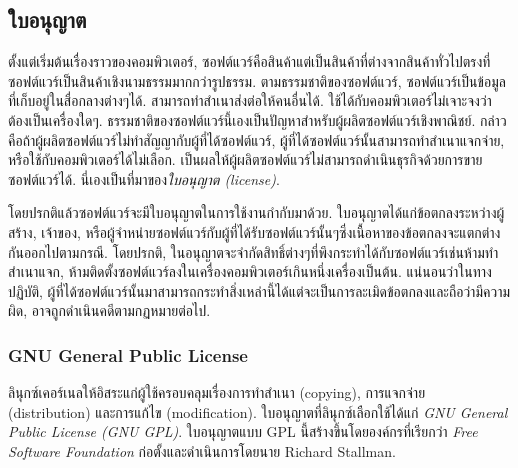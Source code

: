 \begin{thwbr}
{\subsection{ใบอนุญาต}
ตั้งแต่เริ่มต้นเรื่องราวของคอมพิวเตอร์, ซอฟต์แวร์คือสินค้าแต่เป็นสินค้าที่ต่างจากสินค้าทั่วไปตรงที่ซอฟต์แวร์เป็นสินค้าเชิงนามธรรมมากกว่ารูปธรรม. ตามธรรมชาติของซอฟต์แวร์, ซอฟต์แวร์เป็นข้อมูลที่เก็บอยู่ในสื่อกลางต่างๆได้. สามารถทำสำเนาส่งต่อให้คนอื่นได้. ใช้ได้กับคอมพิวเตอร์ไม่เจาะจงว่าต้องเป็นเครื่องใดๆ. ธรรมชาติของซอฟต์แวร์นี้เองเป็นปัญหาสำหรับผู้ผลิตซอฟต์แวร์เชิงพาณิชย์. กล่าวคือถ้าผู้ผลิตซอฟต์แวร์ไม่ทำสัญญากับผู้ที่ได้ซอฟต์แวร์, ผู้ที่ได้ซอฟต์แวร์นั้นสามารถทำสำเนาแจกจ่าย, หรือใช้กับคอมพิวเตอร์ได้ไม่เลือก. เป็นผลให้ผู้ผลิตซอฟต์แวร์ไม่สามารถดำเนินธุรกิจด้วยการขายซอฟต์แวร์ได้. นี่เองเป็นที่มาของ{\em ใบอนุญาต (license)}.

โดยปรกติแล้วซอฟต์แวร์จะมีใบอนุญาตในการใช้งานกำกับมาด้วย. ใบอนุญาตได้แก่ข้อตกลงระหว่างผู้สร้าง, เจ้าของ, หรือผู้จำหน่ายซอฟต์แวร์กับผู้ที่ได้รับซอฟต์แวร์นั้นๆซึ่งเนื้อหาของข้อตกลงจะแตกต่างกันออกไปตามกรณี. โดยปรกติ, ในอนุญาตจะจำกัดสิทธิ์ต่างๆที่พึงกระทำได้กับซอฟต์แวร์เช่นห้ามทำสำเนาแจก, ห้ามติดตั้งซอฟต์แวร์ลงในเครื่องคอมพิวเตอร์เกินหนึ่งเครื่องเป็นต้น. แน่นอนว่าในทางปฏิบัติ, ผู้ที่ได้ซอฟต์แวร์นั้นมาสามารถกระทำสิ่งเหล่านี้ได้แต่จะเป็นการละเมิดข้อตกลงและถือว่ามีความผิด, อาจถูกดำเนินคดีตามกฏหมายต่อไป.


\subsubsection{GNU General Public License}

ลินุกซ์เคอร์เนลให้อิสระแก่ผู้ใช้ครอบคลุมเรื่องการทำสำเนา (copying), การแจกจ่าย (distribution) และการแก้ไข (modification). ใบอนุญาตที่ลินุกซ์เลือกใช้ได้แก่ {\em GNU General Public License (GNU GPL)}. ใบอนุญาตแบบ GPL นี้สร้างขึ้นโดยองค์กรที่เรียกว่า {\em Free Software Foundation} 
ก่อตั้งและดำเนินการโดยนาย Richard Stallman. 

}
\end{thwbr}

